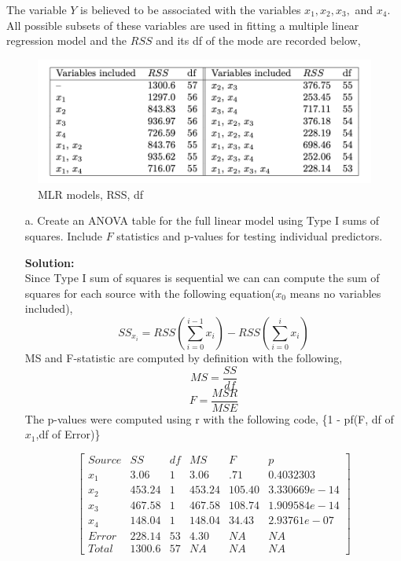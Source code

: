 \documentclass[12pt]{article}
\makeatletter
\theoremstyle{homework}
\newenvironment{exercise}[1]
{\def\@currentlabel{#1}\exercisecore}
{\endexercisecore}
\newcommand{\localhead}[1]{\par\smallskip\noindent\textbf{#1}\nobreak\\}%
\newcommand\solution{\localhead{Solution:}}
\makeatother
\begin{document}
\begin{exercise}{3.} The variable $Y$ is believed to be associated with the variables $x_1, x_2, x_3,$ and $x_4$.
  All possible subsets of these variables are used in fitting a multiple linear regression model and the $RSS$ 
  and its df of the mode are recorded below, 
    \begin{figure}[H]
    \begin{center}
    \caption{MLR models, RSS, df}
    \includegraphics[width = \textwidth]{p1.png}
    \end{center}
    \end{figure}
  \begin{enumerate}
    \item[a.] Create an ANOVA table for the full linear model using Type I sums of squares. Include $F$ statistics 
    and p-values for testing individual predictors. \\

    \solution
    Since Type I sum of squares is sequential we can can compute the sum of squares for each source with the following equation($x_0$ means 
    no variables included), 
    \begin{equation*}
      SS_{x_i} =RSS(\sum_{i = 0}^{i-1} x_i) - RSS(\sum_{i = 0}^i x_i)  
    \end{equation*}
    MS and F-statistic are computed by definition with the following, 
    \begin{equation*}
      MS = \dfrac{SS}{df}
    \end{equation*}
    \begin{equation*}
    F = \dfrac{MSR}{MSE}
    \end{equation*}
    The p-values were computed using r with the following code,  \{1 - pf(F, df of $x_1$,df of Error)\}
    
    \begin{equation*}
      \begin{bmatrix}
        Source & SS & df & MS & F & p\\
        x_1 & 3.06 & 1 & 3.06 &.71 &  0.4032303\\   
        x_2 & 453.24 & 1& 453.24 &105.40 & 3.330669e-14\\
        x_3 & 467.58 & 1& 467.58 & 108.74 & 1.909584e-14\\
        x_4 & 148.04 & 1& 148.04 & 34.43 & 2.93761e-07\\
        Error & 228.14 & 53 & 4.30 & NA&NA \\
        Total & 1300.6 & 57 & NA & NA& NA 
      \end{bmatrix}
    \end{equation*}
    \newpage


\end{enumerate}
\end{exercise}
\end{document}
